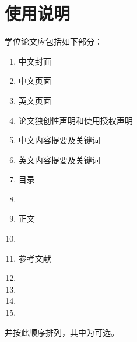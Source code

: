 ﻿\documentclass[figurelist,tablelist,algorithmlist,nomlist,masters]{seuthesix}
\begin{document}
\chapter{使用说明}
学位论文应包括如下部分：\\
\begin{enumerate}
\itshape
\item 中文封面
\item 中文页面
\item 英文页面
\item 论文独创性声明和使用授权声明
\item 中文内容提要及关键词
\item 英文内容提要及关键词
\item 目录
\item {}
\item 正文
\item {}
\item 参考文献
\item  {}
\item {}
\item  {}
\item {}
\end{enumerate}
并按此顺序排列，其中为可选。
\end{document}
